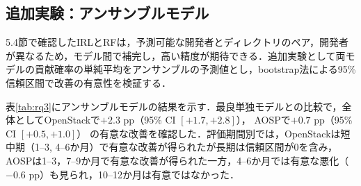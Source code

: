 \documentclass[submit]{ipsj}
\begin{document}

\vspace{-5mm}
\subsection{追加実験：アンサンブルモデル}\label{sec:ensemble}
5.4節で確認したIRLとRFは，予測可能な開発者とディレクトリのペア，開発者が異なるため，モデル間で補完し，高い精度が期待できる．追加実験として両モデルの貢献確率の単純平均をアンサンブルの予測値とし，bootstrap法による95\%信頼区間で改善の有意性を検証する．

表\ref{tab:rq3}にアンサンブルモデルの結果を示す．最良単独モデルとの比較で，全体としてOpenStackで$+2.3$ pp（95\% CI $[+1.7, +2.8]$）， AOSPで$+0.7$ pp（95\% CI $[+0.5, +1.0]$） の有意な改善を確認した．評価期間別では，OpenStackは短中期（1--3, 4--6か月）で有意な改善が得られたが長期は信頼区間が0を含み， AOSPは1--3，7--9か月で有意な改善が得られた一方，4--6か月では有意な悪化（$-0.6$ pp）も見られ，10--12か月は有意ではなかった．
\end{document}
